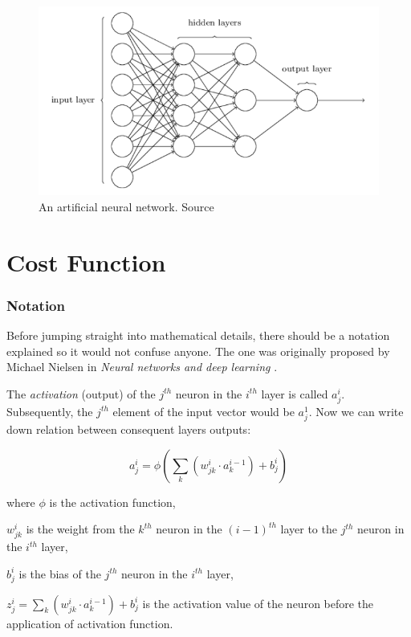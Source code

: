 \begin{figure}[h]
    \centering
    \includegraphics[width=12cm]{img/ANN-diagram.png}
    \caption{An artificial neural network. Source \cite{NNandDL}}
    \label{fig:ann}
\end{figure}

\section{Cost Function}
\label{sec:cost-function}

\subsubsection*{Notation}
\label{sub2:notation}

Before jumping straight into mathematical details, there should be a notation explained so it would not confuse anyone. The one was originally proposed by Michael Nielsen in \emph{Neural networks and deep learning} \cite{NNandDL}.

The \emph{activation} (output) of the $j^{th}$ neuron in the $i^{th}$ layer is called $a^i_j$. Subsequently, the $j^{th}$ element of the input vector would be $a^1_j$. Now we can write down relation between consequent layers outputs:

\begin{equation}
\label{eq:2.1}
a^i_j = \phi\left(\sum_k (w^i_{jk} \cdot a^{i-1}_k) + b^i_j\right)
\end{equation}

where $\phi$ is the activation function,

$w^i_{jk}$ is the weight from the $k^{th}$ neuron in the $(i-1)^{th}$ layer to the $j^{th}$ neuron in the $i^{th}$ layer,

$b^i_j$ is the bias of the $j^{th}$ neuron in the $i^{th}$ layer,

$z^i_j = \sum_k (w^i_{jk} \cdot a^{i-1}_k) + b^i_j$ is the activation value of the neuron before the application of activation function.

